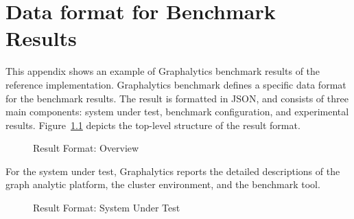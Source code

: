 \chapter{Data format for Benchmark Results}
\label{chap:data-format}
This appendix shows an example of Graphalytics benchmark results of the reference implementation. Graphalytics benchmark defines a specific data format for the benchmark results. The result is formatted in JSON, and consists of three main components: system under test, benchmark configuration, and experimental results. Figure~\ref{fig:result-format:overview} depicts the top-level structure of the result format.

\begin{figure}[h]
	\centering
	\caption{Result Format: Overview}
	\label{fig:result-format:overview}
\end{figure}

For the system under test, Graphalytics reports the detailed descriptions of the graph analytic platform, the cluster environment, and the benchmark tool.

\begin{figure}[!h]
	\centering
	\caption{Result Format: System Under Test}
	\label{fig:result-format:system}
\end{figure}

